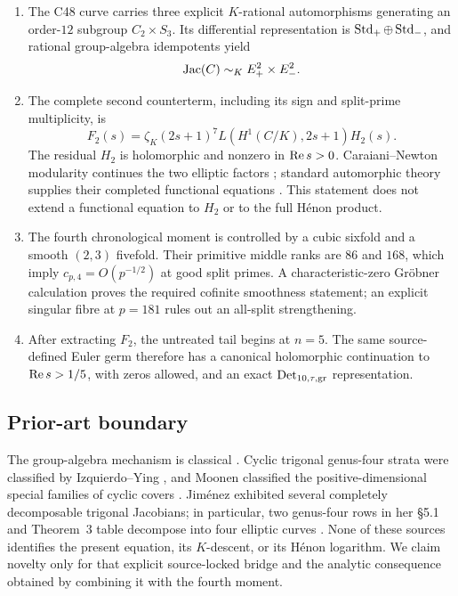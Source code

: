 \begin{enumerate}
\item The C48 curve carries three explicit \(K\)-rational automorphisms
generating an order-\(12\) subgroup \(C_2\times S_3\).  Its differential
representation is \(\operatorname{Std}_+\oplus\operatorname{Std}_-\), and rational group-algebra
idempotents yield
\[
  \operatorname{Jac}(C)\sim_K E_+^2\times E_-^2.
\]
\item The complete second counterterm, including its sign and split-prime
multiplicity, is
\[
 F_2(s)=\zeta_K(2s+1)^7L(H^1(C/K),2s+1)H_2(s).
\]
The residual \(H_2\) is holomorphic and nonzero in \(\operatorname{Re} s>0\).
Caraiani--Newton modularity continues the two elliptic factors
\cite{CaraianiNewton2025}; standard automorphic theory supplies their
completed functional equations \cite[Global Theory, pp.~136--184]
{GodementJacquet1972}.  This statement does not extend a functional equation
to \(H_2\) or to the full H\'enon product.
\item The fourth chronological moment is controlled by a cubic sixfold and
a smooth \((2,3)\) fivefold.  Their primitive middle ranks are \(86\) and
\(168\), which imply \(c_{p,4}=O(p^{-1/2})\) at good split primes.  A
characteristic-zero Gr\"obner calculation proves the required cofinite
smoothness statement; an explicit singular fibre at \(p=181\) rules out an
all-split strengthening.
\item After extracting \(F_2\), the untreated tail begins at \(n=5\).
The same source-defined Euler germ therefore has a canonical holomorphic
continuation to \(\operatorname{Re} s>1/5\), with zeros allowed, and an exact
\(\operatorname{Det}_{10,\tau,\mathrm{gr}}\) representation.
\end{enumerate}

\subsection{Prior-art boundary}\label{sec:prior-firewall}

The group-algebra mechanism is classical
\cite{KaniRosen1989}.  Cyclic trigonal genus-four strata were classified by
Izquierdo--Ying \cite{IzquierdoYing2009}, and Moonen classified the
positive-dimensional special families of cyclic covers
\cite{Moonen2010}.  Jim\'enez exhibited several completely decomposable
trigonal Jacobians; in particular, two genus-four rows in her
\S5.1 and Theorem~3 table decompose into four elliptic curves
\cite{Jimenez2016}.  None of these sources identifies the present equation,
its \(K\)-descent, or its H\'enon logarithm.  We claim novelty only for that
explicit source-locked bridge and the analytic consequence obtained by
combining it with the fourth moment.


